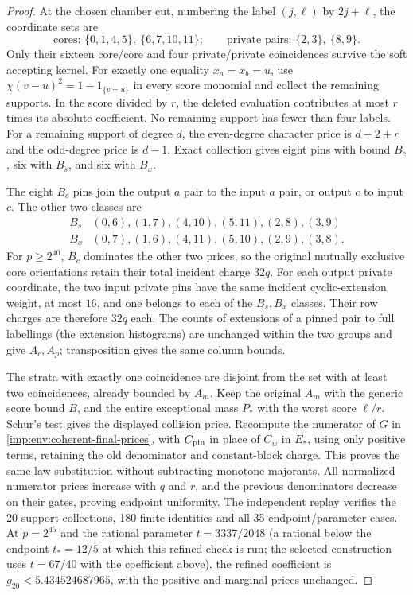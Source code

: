 \begin{proof}
At the chosen chamber cut, numbering the label $(j,\ell)$ by $2j+\ell$, the coordinate sets are
\[
 \text{cores: }\{0,1,4,5\},\ \{6,7,10,11\};
 \qquad \text{private pairs: }\{2,3\},\ \{8,9\}.
\]
Only their sixteen core/core and four
private/private coincidences survive the soft accepting kernel.
For exactly one equality $x_a=x_b=u$, use
$\chi(v-u)^2=1-1_{\{v=u\}}$ in every score monomial and collect the
remaining supports.  In the score divided by $r$, the deleted
evaluation contributes at most $r$ times its absolute coefficient.
No remaining support has fewer than four labels.  For a remaining support of degree $d$, the even-degree
character price is $d-2+r$ and the odd-degree price is $d-1$.
Exact collection gives eight pins with bound $B_c$, six with $B_s$,
and six with $B_x$.

The eight $B_c$ pins join the output $a$ pair to the input $a$ pair,
or output $c$ to input $c$.  The other two classes are
\[
\begin{array}{c|l}
 B_s&(0,6),(1,7),(4,10),(5,11),(2,8),(3,9)\\
 B_x&(0,7),(1,6),(4,11),(5,10),(2,9),(3,8).
\end{array}
\]
For $p\ge2^{40}$, $B_c$ dominates the other two prices, so the original
mutually exclusive core orientations retain their total incident
charge $32q$. For each output private coordinate, the two input
private pins have the same incident cyclic-extension weight, at
most $16$, and one belongs to each of the $B_s,B_x$ classes.
Their row charges are therefore $32q$ each. The counts of
extensions of a pinned pair to full labellings (the extension
histograms) are unchanged within the two groups and give
$A_c,A_p$; transposition
gives the same column bounds.

The strata with exactly one coincidence are disjoint from the set with at least two coincidences, already bounded by $A_m$.
Keep the original $A_m$ with the generic score bound $B$, and the entire
exceptional mass $P_*$ with the worst score $\ell/r$.
Schur's test gives the displayed collision price.
Recompute the numerator of $G$ in \eqref{imp:env:coherent-final-prices}, with $C_{\rm pin}$ in place of $C_w$ in $E_*$, using only positive terms, retaining
the old denominator and constant-block charge.  This proves the
same-law substitution without subtracting monotone majorants.
All normalized numerator prices increase with $q$ and $r$, and the previous
denominators decrease on their gates, proving endpoint uniformity.
The independent replay verifies the 20 support collections,
180 finite identities and all 35 endpoint/parameter cases.
At $p=2^{45}$ and the rational parameter $t=3337/2048$ (a
rational below the endpoint $t_*=12/5$ at which this refined
check is run; the selected construction uses $t=67/40$ with the
coefficient above), the refined coefficient is
$g_{20}<5.434524687965$, with the positive and marginal prices unchanged.
\end{proof}
